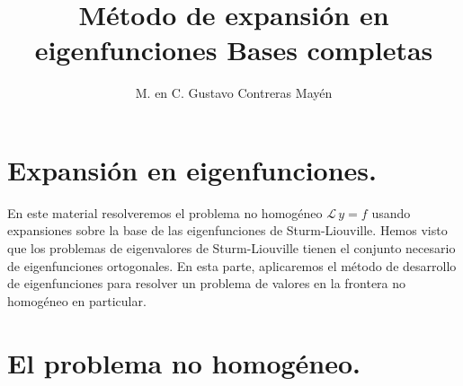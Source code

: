 
\title{Método de expansión en eigenfunciones  \large {Bases completas}\vspace{-3ex}}

\author{M. en C. Gustavo Contreras Mayén}
\date{ }

\pagestyle{fancy}
\fancyhf{}
\lhead{\leftmark}
\rfoot{\thepage}
\setlength{\headheight}{16pt}%



\maketitle
\fontsize{14}{14}\selectfont
\tableofcontents
\newpage

\section{Expansión en eigenfunciones.}

En este material resolveremos el problema no homogéneo $\mathcal{L} \, y = f$ usando expansiones sobre la base de las eigenfunciones de Sturm-Liouville. Hemos visto que los problemas de eigenvalores de Sturm-Liouville tienen el conjunto necesario de eigenfunciones ortogonales. En esta parte, aplicaremos el método de desarrollo de eigenfunciones para resolver un problema de valores en la frontera no homogéneo en particular.

\section{El problema no homogéneo.}

